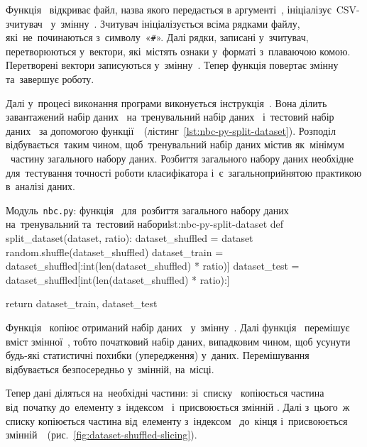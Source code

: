 \documentclass[
	a4paper,
	oneside,
	DIV = 12,
	fontsize = 13pt,
	headings = normal,
	numbers = endperiod,
	bibliography = totoc, %
]{scrartcl}
\theoremstyle{mythm}
\newcommand{\allcaps}[1]{{\addfontfeatures{LetterSpace = 8, Kerning = Off}#1}}
\newcommand{\filename}[1]{\texttt{#1}}
\begin{document}
					Функція~ відкриває файл, назва якого передається в аргументі~, ініціалізує~\textenglish{\allcaps{CSV}}-зчитувач~ у~змінну~. Зчитувач ініціалізується всіма рядками файлу, які~не~починаються з~символу~«\verb|#|». Далі рядки, записані у~зчитувач, перетворюються у~вектори, які~містять ознаки у~форматі з~плаваючою комою. Перетворені вектори записуються у~змінну~. Тепер функція повертає змінну~ та~завершує роботу.

					Далі у~процесі виконання програми виконується інструкція~. Вона ділить завантажений набір даних~ на~тренувальний набір даних~ і~тестовий набір даних~ за допомогою функції~~(лістинг~\ref{lst:nbc-py-split-dataset}). Розподіл відбувається~таким чином, щоб~тренувальний набір даних  містив як~мінімум ~частину загального набору даних. Розбиття загального набору даних необхідне для~тестування точності роботи класифікатора і~є~загальноприйнятою практикою в~аналізі даних. 

				\begin{listingpython}{Модуль~\filename{nbc.py}: функція~ для~розбиття загального набору даних на~тренувальний та~тестовий набори}{lst:nbc-py-split-dataset}
	def split_dataset(dataset, ratio):
			dataset_shuffled = dataset
			random.shuffle(dataset_shuffled)
			dataset_train = dataset_shuffled[:int(len(dataset_shuffled) * ratio)]
			dataset_test = dataset_shuffled[int(len(dataset_shuffled) * ratio):]

			return dataset_train, dataset_test
					\end{listingpython}

					Функція~ копіює отриманий набір даних~ у~змінну~. Далі функція~ перемішує вміст змінної~, тобто початковий набір даних, випадковим чином, щоб усунути будь-які статистичні похибки (упередження) у~даних. Перемішування відбувається безпосередньо у~змінній, на~місці.
					
					Тепер дані діляться на~необхідні частини: зі~списку~ копіюється частина від~початку до~елементу з~індексом~ і~присвоюється змінній . Далі з~цього~ж списку копіюється частина від~елементу з~індексом~ до~кінця і~присвоюється змінній~~(рис.~\ref{fig:dataset-shuffled-slicing}).
\end{document}
